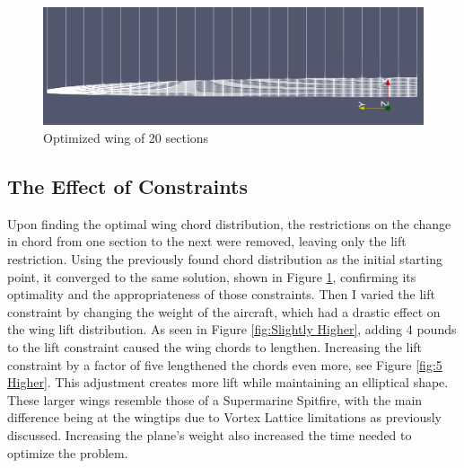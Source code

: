 \documentclass{article}
\begin{document}
\begin{figure}[h]
\centering
\includegraphics[width=\textwidth]{HIGH RES FOCUSED.png}
\caption{Optimized wing of 20 sections}
\label{fig:High Res}
\end{figure}

\subsection{The Effect of Constraints}
Upon finding the optimal wing chord distribution, the restrictions on the change in chord from one section to the next were removed, leaving only the lift restriction. Using the previously found chord distribution as the initial starting point, it converged to the same solution, shown in Figure \ref{fig:High Res}, confirming its optimality and the appropriateness of those constraints. Then I varied the lift constraint by changing the weight of the aircraft, which had a drastic effect on the wing lift distribution. As seen in Figure \ref{fig:Slightly Higher}, adding 4 pounds to the lift constraint caused the wing chords to lengthen. Increasing the lift constraint by a factor of five lengthened the chords even more, see Figure \ref{fig:5 Higher}. This adjustment creates more lift while maintaining an elliptical shape. These larger wings resemble those of a Supermarine Spitfire, with the main difference being at the wingtips due to Vortex Lattice limitations as previously discussed. Increasing the plane's weight also increased the time needed to optimize the problem.
\end{document}
